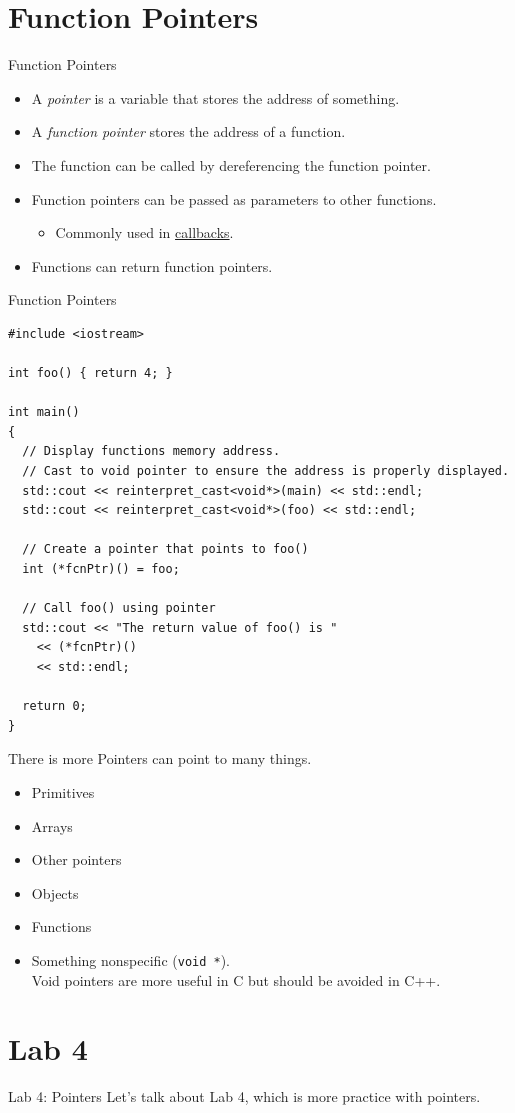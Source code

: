 \documentclass[14pt,aspectratio=1610]{beamer}
\begin{document}
\section{Function Pointers}
\begin{frame}{Function Pointers}
\begin{itemize}[<+->]
  \item
    A \emph{pointer} is a variable that stores the address of something.
  \item
    A \emph{function pointer} stores the address of a function.
  \item
    The function can be called by dereferencing the function pointer.
  \item
    Function pointers can be passed as parameters to other functions.
    \begin{itemize}
      \item 
        Commonly used in \href{https://en.wikipedia.org/wiki/Callback_(computer_programming)}{callbacks}.
    \end{itemize}
  \item
    Functions can return function pointers.
\end{itemize}
\end{frame}

\begin{frame}[fragile]{Function Pointers}
\begin{lstlisting}[basicstyle=\scriptsize\ttfamily]
#include <iostream>

int foo() { return 4; }

int main()
{
  // Display functions memory address.
  // Cast to void pointer to ensure the address is properly displayed.
  std::cout << reinterpret_cast<void*>(main) << std::endl;
  std::cout << reinterpret_cast<void*>(foo) << std::endl;

  // Create a pointer that points to foo()
  int (*fcnPtr)() = foo;

  // Call foo() using pointer
  std::cout << "The return value of foo() is "
    << (*fcnPtr)()
    << std::endl;

  return 0;
}
\end{lstlisting}
\end{frame}

\begin{frame}{There is more}
Pointers can point to many things.
\begin{itemize}
\item Primitives
\item Arrays
\item Other pointers
\item Objects
\item Functions
\item Something nonspecific (\lstinline{void *}).\\
  Void pointers are more useful in C but should be avoided in C++.
\end{itemize}
\end{frame}


\section*{Lab 4}
\begin{frame}{Lab 4: Pointers}
\centering\Large
Let's talk about Lab 4, which is more practice with pointers.
\end{frame}
\end{document}
